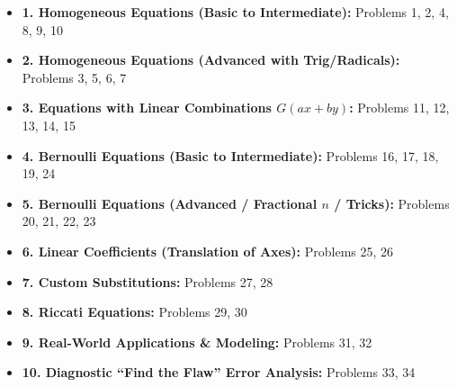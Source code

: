 \documentclass[12pt]{article}
\begin{document}
\begin{itemize}
    \item \textbf{1. Homogeneous Equations (Basic to Intermediate):} Problems 1, 2, 4, 8, 9, 10
    \item \textbf{2. Homogeneous Equations (Advanced with Trig/Radicals):} Problems 3, 5, 6, 7
    \item \textbf{3. Equations with Linear Combinations $G(ax+by)$:} Problems 11, 12, 13, 14, 15
    \item \textbf{4. Bernoulli Equations (Basic to Intermediate):} Problems 16, 17, 18, 19, 24
    \item \textbf{5. Bernoulli Equations (Advanced / Fractional $n$ / Tricks):} Problems 20, 21, 22, 23
    \item \textbf{6. Linear Coefficients (Translation of Axes):} Problems 25, 26
    \item \textbf{7. Custom Substitutions:} Problems 27, 28
    \item \textbf{8. Riccati Equations:} Problems 29, 30
    \item \textbf{9. Real-World Applications \& Modeling:} Problems 31, 32
    \item \textbf{10. Diagnostic ``Find the Flaw'' Error Analysis:} Problems 33, 34
\end{itemize}
\end{document}

